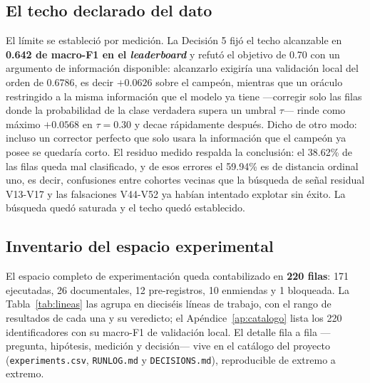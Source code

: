 \documentclass[journal]{IEEEtai}
\begin{document}
\subsection{El techo declarado del dato}

El l\'imite se estableci\'o por medici\'on. La Decisi\'on 5 fij\'o el techo alcanzable en \textbf{0.642 de macro-F1 en el \textit{leaderboard}} y refut\'o el objetivo de 0.70 con un argumento de informaci\'on disponible: alcanzarlo exigir\'ia una validaci\'on local del orden de 0.6786, es decir $+0.0626$ sobre el campe\'on, mientras que un or\'aculo restringido a la misma informaci\'on que el modelo ya tiene ---corregir solo las filas donde la probabilidad de la clase verdadera supera un umbral $\tau$--- rinde como m\'aximo $+0.0568$ en $\tau = 0.30$ y decae r\'apidamente despu\'es. Dicho de otro modo: incluso un corrector perfecto que solo usara la informaci\'on que el campe\'on ya posee se quedar\'ia corto. El residuo medido respalda la conclusi\'on: el 38.62\% de las filas queda mal clasificado, y de esos errores el 59.94\% es de distancia ordinal uno, es decir, confusiones entre cohortes vecinas que la b\'usqueda de se\~nal residual V13-V17 y las falsaciones V44-V52 ya hab\'ian intentado explotar sin \'exito. La b\'usqueda qued\'o saturada y el techo qued\'o establecido.

\subsection{Inventario del espacio experimental}

El espacio completo de experimentaci\'on queda contabilizado en \textbf{220 filas}: 171 ejecutadas,
26 documentales, 12 pre-registros, 10 enmiendas y 1 bloqueada. La Tabla~\ref{tab:lineas} las agrupa
en diecis\'eis l\'ineas de trabajo, con el rango de resultados de cada una y su veredicto; el
Ap\'endice~\ref{ap:catalogo} lista los 220 identificadores con su macro-F1 de validaci\'on local. El
detalle fila a fila ---pregunta, hip\'otesis, medici\'on y decisi\'on--- vive en el cat\'alogo del
proyecto (\texttt{experiments.csv}, \texttt{RUNLOG.md} y \texttt{DECISIONS.md}), reproducible de
extremo a extremo.
\end{document}
